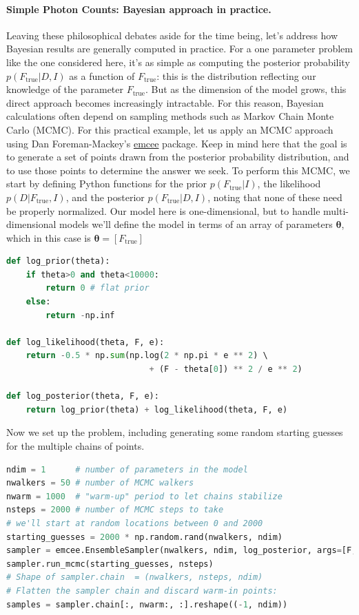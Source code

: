 \documentclass[%
oneside,                 %
final,                   %
10pt]{article}
\begin{document}
\paragraph{Simple Photon Counts: Bayesian approach in practice.}
Leaving these philosophical debates aside for the time being, let's address how Bayesian results are generally computed in practice. For a one parameter problem like the one considered here, it's as simple as computing the posterior probability $p(F_\mathrm{true} | D,I)$ as a function of $F_\mathrm{true}$: this is the distribution reflecting our knowledge of the parameter $F_\mathrm{true}$.
But as the dimension of the model grows, this direct approach becomes increasingly intractable. For this reason, Bayesian calculations often depend on sampling methods such as Markov Chain Monte Carlo (MCMC). For this practical example, let us apply an MCMC approach using Dan Foreman-Mackey's \href{{http://dan.iel.fm/emcee/current/}}{emcee} package. Keep in mind here that the goal is to generate a set of points drawn from the posterior probability distribution, and to use those points to determine the answer we seek.
To perform this MCMC, we start by defining Python functions for the prior $p(F_\mathrm{true} | I)$, the likelihood $p(D | F_\mathrm{true},I)$, and the posterior $p(F_\mathrm{true} | D,I)$, noting that none of these need be properly normalized. Our model here is one-dimensional, but to handle multi-dimensional models we'll define the model in terms of an array of parameters $\boldsymbol{\theta}$, which in this case is $\boldsymbol{\theta} = [F_\mathrm{true}]$

\begin{lstlisting}[language=Python,style=blue1]
def log_prior(theta):
    if theta>0 and theta<10000:
        return 0 # flat prior
    else:
        return -np.inf

def log_likelihood(theta, F, e):
    return -0.5 * np.sum(np.log(2 * np.pi * e ** 2) \ 
                             + (F - theta[0]) ** 2 / e ** 2)
                             
def log_posterior(theta, F, e):
    return log_prior(theta) + log_likelihood(theta, F, e)
\end{lstlisting}

Now we set up the problem, including generating some random starting guesses for the multiple chains of points.

\begin{lstlisting}[language=Python,style=blue1]
ndim = 1      # number of parameters in the model
nwalkers = 50 # number of MCMC walkers
nwarm = 1000  # "warm-up" period to let chains stabilize
nsteps = 2000 # number of MCMC steps to take
# we'll start at random locations between 0 and 2000
starting_guesses = 2000 * np.random.rand(nwalkers, ndim)
sampler = emcee.EnsembleSampler(nwalkers, ndim, log_posterior, args=[F,e])
sampler.run_mcmc(starting_guesses, nsteps)
# Shape of sampler.chain  = (nwalkers, nsteps, ndim)
# Flatten the sampler chain and discard warm-in points:
samples = sampler.chain[:, nwarm:, :].reshape((-1, ndim))
\end{lstlisting}
\end{document}
